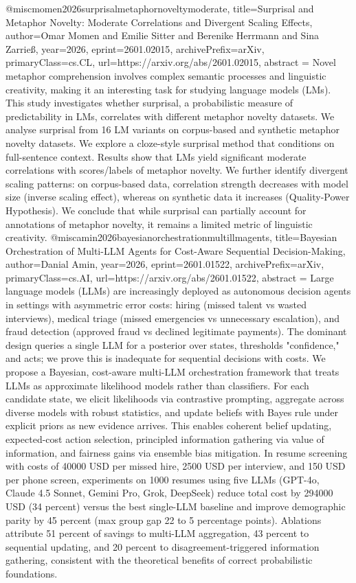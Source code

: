 {}@misc{momen2026surprisalmetaphornoveltymoderate,
      title={Surprisal and Metaphor Novelty: Moderate Correlations and Divergent Scaling Effects}, 
      author={Omar Momen and Emilie Sitter and Berenike Herrmann and Sina Zarrieß},
      year={2026},
      eprint={2601.02015},
      archivePrefix={arXiv},
      primaryClass={cs.CL},
      url={https://arxiv.org/abs/2601.02015},
      abstract = {Novel metaphor comprehension involves complex semantic processes and linguistic creativity, making it an interesting task for studying language models (LMs). This study investigates whether surprisal, a probabilistic measure of predictability in LMs, correlates with different metaphor novelty datasets. We analyse surprisal from 16 LM variants on corpus-based and synthetic metaphor novelty datasets. We explore a cloze-style surprisal method that conditions on full-sentence context. Results show that LMs yield significant moderate correlations with scores/labels of metaphor novelty. We further identify divergent scaling patterns: on corpus-based data, correlation strength decreases with model size (inverse scaling effect), whereas on synthetic data it increases (Quality-Power Hypothesis). We conclude that while surprisal can partially account for annotations of metaphor novelty, it remains a limited metric of linguistic creativity.}
}@misc{amin2026bayesianorchestrationmultillmagents,
      title={Bayesian Orchestration of Multi-LLM Agents for Cost-Aware Sequential Decision-Making}, 
      author={Danial Amin},
      year={2026},
      eprint={2601.01522},
      archivePrefix={arXiv},
      primaryClass={cs.AI},
      url={https://arxiv.org/abs/2601.01522},
      abstract = {Large language models (LLMs) are increasingly deployed as autonomous decision agents in settings with asymmetric error costs: hiring (missed talent vs wasted interviews), medical triage (missed emergencies vs unnecessary escalation), and fraud detection (approved fraud vs declined legitimate payments). The dominant design queries a single LLM for a posterior over states, thresholds "confidence," and acts; we prove this is inadequate for sequential decisions with costs. We propose a Bayesian, cost-aware multi-LLM orchestration framework that treats LLMs as approximate likelihood models rather than classifiers. For each candidate state, we elicit likelihoods via contrastive prompting, aggregate across diverse models with robust statistics, and update beliefs with Bayes rule under explicit priors as new evidence arrives. This enables coherent belief updating, expected-cost action selection, principled information gathering via value of information, and fairness gains via ensemble bias mitigation. In resume screening with costs of 40000 USD per missed hire, 2500 USD per interview, and 150 USD per phone screen, experiments on 1000 resumes using five LLMs (GPT-4o, Claude 4.5 Sonnet, Gemini Pro, Grok, DeepSeek) reduce total cost by 294000 USD (34 percent) versus the best single-LLM baseline and improve demographic parity by 45 percent (max group gap 22 to 5 percentage points). Ablations attribute 51 percent of savings to multi-LLM aggregation, 43 percent to sequential updating, and 20 percent to disagreement-triggered information gathering, consistent with the theoretical benefits of correct probabilistic foundations.}
}
